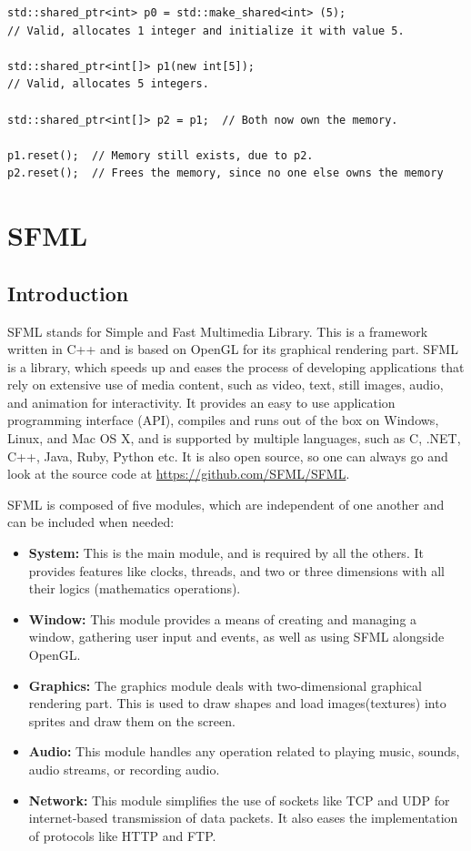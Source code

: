 \documentclass[main]{subfiles}
\begin{document}
\begin{verbatim}
std::shared_ptr<int> p0 = std::make_shared<int> (5);
// Valid, allocates 1 integer and initialize it with value 5.

std::shared_ptr<int[]> p1(new int[5]);
// Valid, allocates 5 integers.

std::shared_ptr<int[]> p2 = p1;  // Both now own the memory.

p1.reset();  // Memory still exists, due to p2.
p2.reset();  // Frees the memory, since no one else owns the memory
\end{verbatim}

\section{SFML}
\subsection{Introduction}
SFML stands for Simple and Fast Multimedia Library. This is a framework written in C++ and is based on OpenGL for its graphical rendering part. 
SFML is a library, which speeds up and eases the process of developing applications that rely on extensive use of media content, such as video, text, still images, audio, and animation for interactivity. It provides an easy to use application programming interface (API), compiles and runs out of the box on Windows, Linux, and Mac OS X, and is supported by multiple languages, such as C, .NET, C++, Java, Ruby, Python etc. It is also open source, so one can always go and look at the source code at \url{https://github.com/SFML/SFML}. 

SFML is composed of five modules, which are independent of one another and can be included when needed:
\begin{itemize}

\item \textbf{System:} This is the main module, and is required by all the others. It provides features like clocks, threads, and two or three dimensions with all their logics (mathematics operations).

\item \textbf{Window:} This module provides a means of creating and managing a window, gathering user input and events, as well as using SFML alongside OpenGL.

\item \textbf{Graphics:} The graphics module deals with two-dimensional graphical rendering part. This is used to draw shapes and load images(textures) into sprites and draw them on the screen.

\item \textbf{Audio:} This module handles any operation related to playing music, sounds, audio streams, or recording audio.

\item \textbf{Network:} This module simplifies the use of sockets like TCP and UDP for internet-based transmission of data packets. It also eases the implementation of protocols like HTTP and FTP.

\end{itemize}
\end{document}
